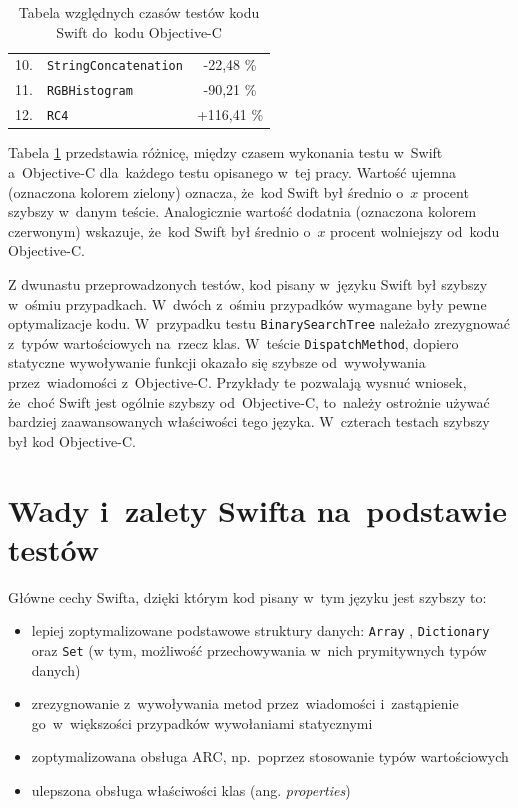 \documentclass[mgr, shortabstract]{iithesis}
\newcommand{\ang}[1]{ang. \textit{#1}}
\newcommand{\swiftinline}[1]{
    \texttt{#1}
}
\begin{document}
\begin{table}[!ht]
\begin{tabularx}{1.0\textwidth}{ rXc }
        10. & \texttt{StringConcatenation}                    & \textcolor{MTGreen}{-22,48 \%}    \\ 
        11. & \texttt{RGBHistogram}                           & \textcolor{MTGreen}{-90,21 \%}    \\ 
        12. & \texttt{RC4}                                    & \textcolor{MTRed}{+116,41 \%}     \\ 
        \hline
    \end{tabularx}
    \caption{Tabela względnych czasów testów kodu Swift do~kodu Objective-C}
    \label{t:results}
\end{table}

Tabela \ref{t:results} przedstawia różnicę, między czasem wykonania testu w~Swift a~Objective-C dla~każdego testu opisanego w~tej pracy. Wartość ujemna (oznaczona kolorem zielony) oznacza, że~kod Swift był średnio o~$x$ procent szybszy w~danym teście. Analogicznie wartość dodatnia (oznaczona kolorem czerwonym) wskazuje, że~kod Swift był średnio o~$x$ procent wolniejszy od~kodu Objective-C.

Z dwunastu przeprowadzonych testów, kod pisany w~języku Swift był szybszy w~ośmiu przypadkach. W~dwóch z~ośmiu przypadków wymagane były pewne optymalizacje kodu. W~przypadku testu \texttt{BinarySearchTree} należało zrezygnować z~typów wartościowych na~rzecz klas. W~teście \texttt{DispatchMethod}, dopiero statyczne wywoływanie funkcji okazało się szybsze od~wywoływania przez~wiadomości z~Objective-C. Przykłady te pozwalają wysnuć wniosek, że~choć Swift jest ogólnie szybszy od~Objective-C, to~należy ostrożnie używać bardziej zaawansowanych właściwości tego języka. W~czterach testach szybszy był kod Objective-C.

\section{Wady i~zalety Swifta na~podstawie testów}

Główne cechy Swifta, dzięki którym kod pisany w~tym języku jest szybszy to:
\begin{itemize}
    \item lepiej zoptymalizowane podstawowe struktury danych: \swiftinline{Array}, \swiftinline{Dictionary} oraz \swiftinline{Set} (w tym, możliwość przechowywania w~nich prymitywnych typów danych)
    \item zrezygnowanie z~wywoływania metod przez~wiadomości i~zastąpienie go~w~większości przypadków wywołaniami statycznymi
    \item zoptymalizowana obsługa ARC, np.~poprzez stosowanie typów wartościowych   
    \item ulepszona obsługa właściwości klas (\ang{properties})    
\end{itemize}
\end{document}
